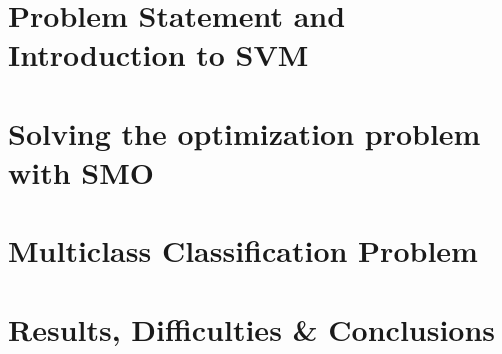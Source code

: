 \documentclass[12pt, a4paper, openany]{article} %
\theoremstyle{definition}
\numberwithin{equation}{section}
\begin{document}
\cleardoublepage
  \pagestyle{plain}

\section{Problem Statement and Introduction to SVM}



\section{Solving the optimization problem with SMO}



\section{Multiclass Classification Problem}\label{ch_multiclass}



\section{Results, Difficulties \& Conclusions}



  

%  
\end{document}
